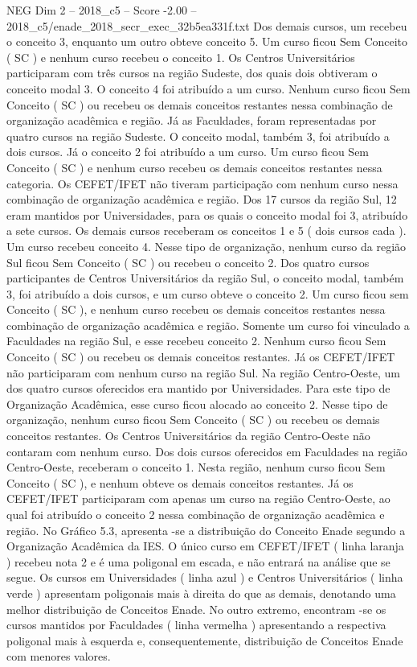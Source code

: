 \begin{textsample}{NEG Dim 2 – 2018\_c5 – Score -2.00 – 2018\_c5/enade\_2018\_secr\_exec\_32b5ea331f.txt}
Dos demais cursos, um recebeu o conceito 3, enquanto um outro obteve conceito 5.
Um curso ficou Sem Conceito ( SC ) e nenhum curso recebeu o conceito 1.
Os Centros Universitários participaram com três cursos na região Sudeste, dos quais dois obtiveram o conceito modal 3.
O conceito 4 foi atribuído a um curso.
Nenhum curso ficou Sem Conceito ( SC ) ou recebeu os demais conceitos restantes nessa combinação de organização acadêmica e região.
Já as Faculdades, foram representadas por quatro cursos na região Sudeste.
O conceito modal, também 3, foi atribuído a dois cursos.
Já o conceito 2 foi atribuído a um curso.
Um curso ficou Sem Conceito ( SC ) e nenhum curso recebeu os demais conceitos restantes nessa categoria.
Os CEFET/IFET não tiveram participação com nenhum curso nessa combinação de organização acadêmica e região.
Dos 17 cursos da região Sul, 12 eram mantidos por Universidades, para os quais o conceito modal foi 3, atribuído a sete cursos.
Os demais cursos receberam os conceitos 1 e 5 ( dois cursos cada ).
Um curso recebeu conceito 4.
Nesse tipo de organização, nenhum curso da região Sul ficou Sem Conceito ( SC ) ou recebeu o conceito 2.
Dos quatro cursos participantes de Centros Universitários da região Sul, o conceito modal, também 3, foi atribuído a dois cursos, e um curso obteve o conceito 2.
Um curso ficou sem Conceito ( SC ), e nenhum curso recebeu os demais conceitos restantes nessa combinação de organização acadêmica e região.
Somente um curso foi vinculado a Faculdades na região Sul, e esse recebeu conceito 2.
Nenhum curso ficou Sem Conceito ( SC ) ou recebeu os demais conceitos restantes.
Já os CEFET/IFET não participaram com nenhum curso na região Sul.
Na região Centro-Oeste, um dos quatro cursos oferecidos era mantido por Universidades.
Para este tipo de Organização Acadêmica, esse curso ficou alocado ao conceito 2.
Nesse tipo de organização, nenhum curso ficou Sem Conceito ( SC ) ou recebeu os demais conceitos restantes.
Os Centros Universitários da região Centro-Oeste não contaram com nenhum curso.
Dos dois cursos oferecidos em Faculdades na região Centro-Oeste, receberam o conceito 1.
Nesta região, nenhum curso ficou Sem Conceito ( SC ), e nenhum obteve os demais conceitos restantes.
Já os CEFET/IFET participaram com apenas um curso na região Centro-Oeste, ao qual foi atribuído o conceito 2 nessa combinação de organização acadêmica e região.
No Gráfico 5.3, apresenta -se a distribuição do Conceito Enade segundo a Organização Acadêmica da IES.
O único curso em CEFET/IFET ( linha laranja ) recebeu nota 2 e é uma poligonal em escada, e não entrará na análise que se segue.
Os cursos em Universidades ( linha azul ) e Centros Universitários ( linha verde ) apresentam poligonais mais à direita do que as demais, denotando uma melhor distribuição de Conceitos Enade.
No outro extremo, encontram -se os cursos mantidos por Faculdades ( linha vermelha ) apresentando a respectiva poligonal mais à esquerda e, consequentemente, distribuição de Conceitos Enade com menores valores.

\end{textsample}
